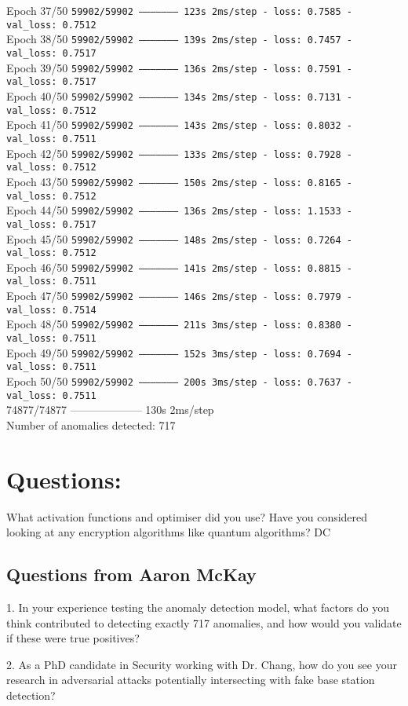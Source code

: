 Epoch 37/50
\texttt{59902/59902 -------------------- 123s 2ms/step - loss: 0.7585 - val\_loss: 0.7512}\\
Epoch 38/50
\texttt{59902/59902 -------------------- 139s 2ms/step - loss: 0.7457 - val\_loss: 0.7517}\\
Epoch 39/50
\texttt{59902/59902 -------------------- 136s 2ms/step - loss: 0.7591 - val\_loss: 0.7517}\\
Epoch 40/50
\texttt{59902/59902 -------------------- 134s 2ms/step - loss: 0.7131 - val\_loss: 0.7512}\\
Epoch 41/50
\texttt{59902/59902 -------------------- 143s 2ms/step - loss: 0.8032 - val\_loss: 0.7511}\\
Epoch 42/50
\texttt{59902/59902 -------------------- 133s 2ms/step - loss: 0.7928 - val\_loss: 0.7512}\\
Epoch 43/50
\texttt{59902/59902 -------------------- 150s 2ms/step - loss: 0.8165 - val\_loss: 0.7512}\\
Epoch 44/50
\texttt{59902/59902 -------------------- 136s 2ms/step - loss: 1.1533 - val\_loss: 0.7517}\\
Epoch 45/50
\texttt{59902/59902 -------------------- 148s 2ms/step - loss: 0.7264 - val\_loss: 0.7512}\\
Epoch 46/50
\texttt{59902/59902 -------------------- 141s 2ms/step - loss: 0.8815 - val\_loss: 0.7511}\\
Epoch 47/50
\texttt{59902/59902 -------------------- 146s 2ms/step - loss: 0.7979 - val\_loss: 0.7514}\\
Epoch 48/50
\texttt{59902/59902 -------------------- 211s 3ms/step - loss: 0.8380 - val\_loss: 0.7511}\\
Epoch 49/50
\texttt{59902/59902 -------------------- 152s 3ms/step - loss: 0.7694 - val\_loss: 0.7511}\\
Epoch 50/50
\texttt{59902/59902 -------------------- 200s 3ms/step - loss: 0.7637 - val\_loss: 0.7511}\\
74877/74877 -------------------- 130s 2ms/step\\
Number of anomalies detected: 717

\section*{Questions: }
What activation functions and optimiser did you use?
Have you considered looking at any encryption algorithms like quantum algorithms? DC

\subsection{Questions from Aaron McKay}
1. In your experience testing the anomaly detection model, what factors do you think contributed to detecting exactly 717 anomalies, and how would you validate if these were true positives?

2. As a PhD candidate in Security working with Dr. Chang, how do you see your research in adversarial attacks potentially intersecting with fake base station detection?
